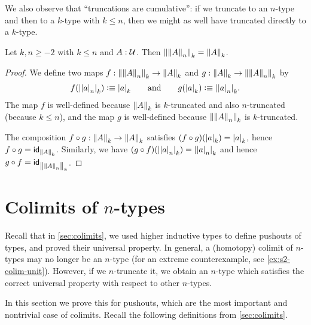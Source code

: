 We also observe that ``truncations are cumulative'': if we truncate to an $n$-type and then to a $k$-type with $k\le n$, then we might as
well have truncated directly to a $k$-type.

\begin{lem} \label{lem:truncation-le}
  Let $k,n\ge-2$ with $k\le{}n$ and $A:\type$. Then
  $\trunc k{\trunc nA}=\trunc kA$.
\end{lem}
\begin{proof}
  We define two maps $f:\trunc k{\trunc nA}\to\trunc kA$ and
  $g:\trunc kA\to\trunc k{\trunc nA}$ by
  \[
   f(\tproj k{\tproj na}) \defeq \tproj ka
   \qquad\text{and}\qquad
   g(\tproj ka) \defeq \tproj k{\tproj na}.
  \]
  The map $f$ is well-defined because $\trunc kA$ is $k$-truncated and also
  $n$-truncated (because $k\le{}n$), and the map $g$ is well-defined because
  $\trunc k{\trunc nA}$ is $k$-truncated.

  The composition $f\circ{}g:\trunc kA\to\trunc kA$ satisfies
  $(f\circ{}g)(\tproj ka)=\tproj ka$, hence $f\circ{}g=\idfunc[\trunc kA]$.
  Similarly, we have $(g\circ{}f)(\tproj k{\tproj na})=\tproj k{\tproj na}$ and hence $g\circ{}f=\idfunc[\trunc k{\trunc nA}]$.
\end{proof}


%

\section{Colimits of \texorpdfstring{$n$}{n}-types}
\label{sec:pushouts}

Recall that in \autoref{sec:colimits}, we used higher inductive types to define pushouts of types, and proved their universal property.
In general, a (homotopy) colimit of $n$-types may no longer be an $n$-type (for an extreme counterexample, see \autoref{ex:s2-colim-unit}).
However, if we $n$-truncate it, we obtain an $n$-type which satisfies the correct universal property with respect to other $n$-types.

In this section we prove this for pushouts, which are the most important and nontrivial case of colimits.
Recall the following definitions from \autoref{sec:colimits}.

